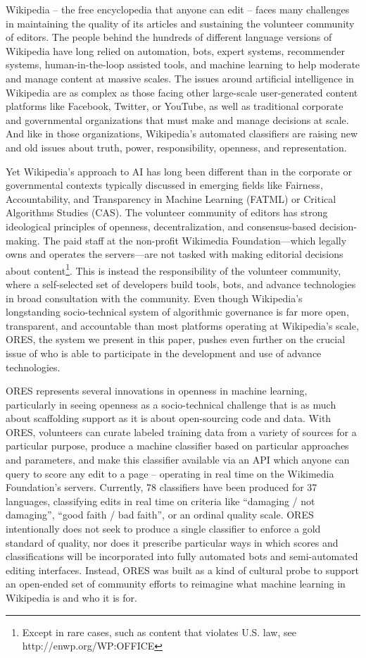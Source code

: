 Wikipedia -- the free encyclopedia that anyone can edit -- faces many challenges in maintaining the quality of its articles and sustaining the volunteer community of editors. The people behind the hundreds of different language versions of Wikipedia have long relied on automation, bots, expert systems, recommender systems, human-in-the-loop assisted tools, and machine learning to help moderate and manage content at massive scales. The issues around artificial intelligence in Wikipedia are as complex as those facing other large-scale user-generated content platforms like Facebook, Twitter, or YouTube, as well as traditional corporate and governmental organizations that must make and manage decisions at scale. And like in those organizations, Wikipedia's automated classifiers are raising new and old issues about truth, power, responsibility, openness, and representation.

Yet Wikipedia's approach to AI has long been different than in the corporate or governmental contexts typically discussed in emerging fields like Fairness, Accountability, and Transparency in Machine Learning (FATML) or Critical Algorithms Studies (CAS). The volunteer community of editors has strong ideological principles of openness, decentralization, and consensus-based decision-making. The paid staff at the non-profit Wikimedia Foundation---which legally owns and operates the servers---are not tasked with making editorial decisions about content\footnote{Except in rare cases, such as content that violates U.S. law, see http://enwp.org/WP:OFFICE}. This is instead the responsibility of the volunteer community, where a self-selected set of developers build tools, bots, and advance technologies in broad consultation with the community. Even though Wikipedia's longstanding socio-technical system of algorithmic governance is far more open, transparent, and accountable than most platforms operating at Wikipedia's scale, ORES, the system we present in this paper, pushes even further on the crucial issue of who is able to participate in the development and use of advance technologies.

ORES represents several innovations in openness in machine learning, particularly in seeing openness as a socio-technical challenge that is as much about scaffolding support as it is about open-sourcing code and data. With ORES, volunteers can curate labeled training data from a variety of sources for a particular purpose, produce a machine classifier based on particular approaches and parameters, and make this classifier available via an API which anyone can query to score any edit to a page -- operating in real time on the Wikimedia Foundation's servers. Currently, 78 classifiers have been produced for 37 languages, classifying edits in real time on criteria like ``damaging / not damaging'', ``good faith / bad faith'', or an ordinal quality scale. ORES intentionally does not seek to produce a single classifier to enforce a gold standard of quality, nor does it prescribe particular ways in which scores and classifications will be incorporated into fully automated bots and semi-automated editing interfaces. Instead, ORES was built as a kind of cultural probe to support an open-ended set of community efforts to reimagine what machine learning in Wikipedia is and who it is for.

